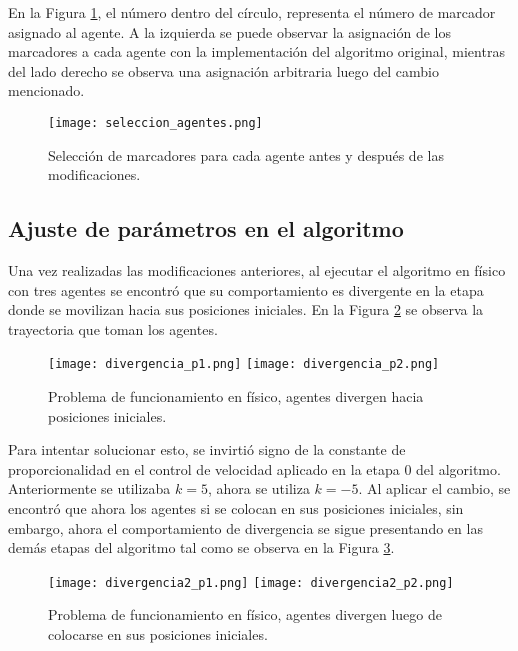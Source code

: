 En la Figura \ref{fig:seleccion_agentes}, el número dentro del círculo, representa el número de marcador asignado al agente. A la izquierda se puede observar la asignación de los marcadores a cada agente con la implementación del algoritmo original, mientras del lado derecho se observa una asignación arbitraria luego del cambio mencionado.


\begin{figure}[H]
	\centering
	\texttt{[image: seleccion\_agentes.png]}
	\caption{Selección de marcadores para cada agente antes y después de las modificaciones.}
	\label{fig:seleccion_agentes}
\end{figure}


\subsection{Ajuste de parámetros en el algoritmo}
Una vez realizadas las modificaciones anteriores, al ejecutar el algoritmo en físico con tres agentes se encontró que su comportamiento es divergente en la etapa donde se movilizan hacia sus posiciones iniciales. En la Figura \ref{fig:divergencia1} se observa la trayectoria que toman los agentes.

\begin{figure}[H]
	\centering
	\texttt{[image: divergencia\_p1.png]}
	\texttt{[image: divergencia\_p2.png]}
	\caption{Problema de funcionamiento en físico, agentes divergen hacia posiciones iniciales. }
	\label{fig:divergencia1}
\end{figure}

Para intentar solucionar esto, se invirtió signo de la constante de proporcionalidad en el control de velocidad aplicado en la etapa 0 del algoritmo. Anteriormente se utilizaba $k = 5$, ahora se utiliza $k = -5$. Al aplicar el cambio, se encontró que ahora los agentes si se colocan en sus posiciones iniciales, sin embargo, ahora el comportamiento de divergencia se sigue presentando en las demás etapas del algoritmo tal como se observa en la Figura \ref{fig:divergencia2}.

\begin{figure}[H]
	\centering
	\texttt{[image: divergencia2\_p1.png]}
	\texttt{[image: divergencia2\_p2.png]}
	\caption{Problema de funcionamiento en físico, agentes divergen luego de colocarse en sus posiciones iniciales.}
	\label{fig:divergencia2}
\end{figure}

